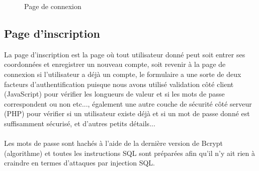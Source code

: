 \documentclass[12pt]{report}
\begin{document}
\vspace{0.5in}

\begin{figure}[h]
\centering
\caption{Page de connexion}
\end{figure}

\newpage

\subsection{Page d'inscription}

\vspace{0.2in}

La page d'inscription est la page où tout utilisateur donné peut soit entrer ses coordonnées et enregistrer un nouveau compte, soit revenir à la page de connexion si l'utilisateur a déjà un compte, le formulaire a une sorte de deux facteurs d'authentification puisque nous avons utilisé validation côté client (JavaScript) pour vérifier les longueurs de valeur et si les mots de passe correspondent ou non etc..., également une autre couche de sécurité côté serveur (PHP) pour vérifier si un utilisateur existe déjà et si un mot de passe donné est suffisamment sécurisé, et d'autres petits détails...
\\\\
Les mots de passe sont hachés à l'aide de la dernière version de Bcrypt (algorithme) et toutes les instructions SQL sont préparées afin qu'il n'y ait rien à craindre en termes d'attaques par injection SQL.
\end{document}
